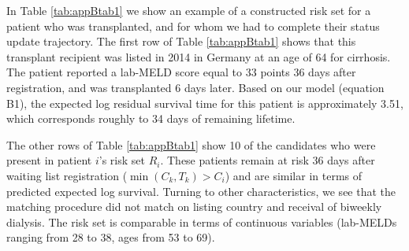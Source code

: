 \documentclass[11pt,twoside,]{book}
\begin{document}
In Table \ref{tab:appBtab1} we show an example of a constructed
risk set for a patient who was transplanted, and for whom we had to
complete their status update trajectory. The first row of Table
\ref{tab:appBtab1} shows that this transplant recipient was listed in 2014
in Germany at an age of 64 for cirrhosis. The
patient reported a lab-MELD score equal to 33 points 36 days after
registration, and was
transplanted 6 days later. Based on our model (equation B1), the
expected log residual survival time for this patient is approximately 3.51,
which corresponds roughly to 34 days of remaining lifetime.

The other rows of Table \ref{tab:appBtab1} show 10 of the candidates
who were present in patient \(i\)'s risk set \(R_i\). These patients remain at
risk 36 days after waiting list registration (\(\min(C_{k}, T_k) > C_i\))
and are similar in terms of predicted expected log survival. Turning to
other characteristics, we see that the matching procedure did not match
on listing country and receival of biweekly dialysis. The risk set is
comparable in terms of continuous variables (lab-MELDs ranging from 28
to 38, ages from 53 to 69).
\end{document}
